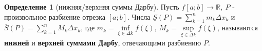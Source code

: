 \documentclass{report}
\theoremstyle{definition}
\newtheorem{definition}{Определение}[section]
\begin{document}
\begin{definition}[нижняя/верхняя суммы Дарбу]
  Пусть $f[a;b] \rightarrow \mathbb{R}, \ P$ - произвольное разбиение отрезка $[a;b]$. Числа
  $\underline{S}(P) = \sum_{k=1}^{n}m_{k}\Delta x_{k}$ и $\overline{S}(P) = \sum_{k=1}^{n}M_{k}
    \Delta x_{k}$, где $m_{k} = \underset{\xi \in \Delta k}{\inf}f(\xi), \ M_{k} = \underset{\xi\in\Delta k}
    {\sup}f(\xi)$, называются \textbf{нижней} и \textbf{верхней суммами Дарбу}, отвечающими разбиению $P$.

  \begin{figure}[h]
    \begin{minipage}[h]{0.49\linewidth}
    \end{minipage}
    \hfill
    \begin{minipage}[h]{0.49\linewidth}
    \end{minipage}
  \end{figure}
\end{definition}
\end{document}
